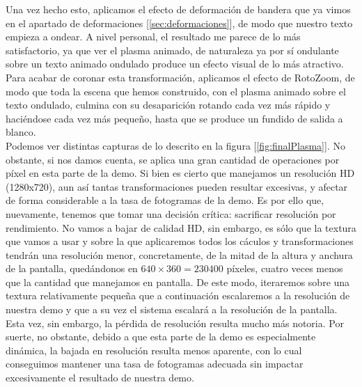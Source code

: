 Una vez hecho esto, aplicamos el efecto de deformación de bandera que ya vimos en el apartado de deformaciones [\ref{sec:deformaciones}], de modo que nuestro texto empieza a ondear. A nivel personal, el resultado me parece de lo más satisfactorio, ya que ver el plasma animado, de naturaleza ya por sí ondulante sobre un texto animado ondulado produce un efecto visual de lo más atractivo. Para acabar de coronar esta transformación, aplicamos el efecto de RotoZoom, de modo que toda la escena que hemos construido, con el plasma animado sobre el texto ondulado, culmina con su desaparición rotando cada vez más rápido y haciéndose cada vez más pequeño, hasta que se produce un fundido de salida a blanco.\\ 

Podemos ver distintas capturas de lo descrito en la figura [\ref{fig:finalPlasma}]. No obstante, si nos damos cuenta, se aplica una gran cantidad de operaciones por píxel en esta parte de la demo. Si bien es cierto que manejamos un resolución HD (1280x720), aun así tantas transformaciones pueden resultar excesivas, y afectar de forma considerable a la tasa de fotogramas de la demo. Es por ello que, nuevamente, tenemos que tomar una decisión crítica: sacrificar resolución por rendimiento. No vamos a bajar de calidad HD, sin embargo, es sólo que la textura que vamos a usar y sobre la que aplicaremos todos los cáculos y transformaciones tendrán una resolución menor, concretamente, de la mitad de la altura y anchura de la pantalla, quedándonos en \(640 \times 360 = 230400\) píxeles, cuatro veces menos que la cantidad que manejamos en pantalla. De este modo, iteraremos sobre una textura relativamente pequeña que a continuación escalaremos a la resolución de nuestra demo y que a su vez el sistema escalará a la resolución de la pantalla.\\

Esta vez, sin embargo, la pérdida de resolución resulta mucho más notoria. Por suerte, no obstante, debido a que esta parte de la demo es especialmente dinámica, la bajada en resolución resulta menos aparente, con lo cual conseguimos mantener una tasa de fotogramas adecuada sin impactar excesivamente el resultado de nuestra demo.\\

